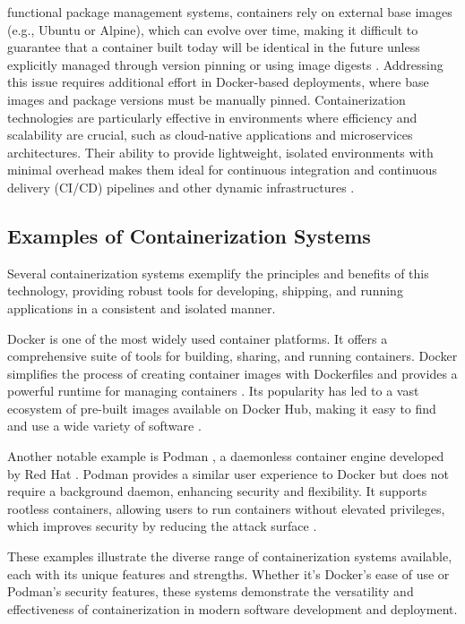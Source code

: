 functional package management systems, containers rely on external base images
(e.g., Ubuntu or Alpine), which can evolve over time, making it difficult to
guarantee that a container built today will be identical in the future unless
explicitly managed through version pinning or using image digests
\cite{InotifySharedDrives}. Addressing this issue requires additional
effort in Docker-based deployments, where base images and package versions
must be manually pinned.
Containerization technologies are particularly effective in environments
where efficiency and scalability are crucial, such as
cloud-native applications and microservices architectures. Their ability
to provide lightweight, isolated environments with minimal overhead makes
them ideal for continuous integration and continuous delivery (CI/CD)
pipelines and other dynamic infrastructures \cite{Cgroups2024}.

\subsection{Examples of Containerization Systems}

Several containerization systems exemplify the principles and benefits of this
technology, providing robust tools for developing, shipping, and running applications
in a consistent and isolated manner.

Docker \cite{DockerHomepage2022} is one of the most widely used container platforms.
It offers a comprehensive suite of tools for building, sharing, and running containers.
Docker simplifies the process of creating container images with Dockerfiles and
provides a powerful runtime for managing containers \cite{DockerfileReference0200}.
Its popularity has led to a vast ecosystem of pre-built images available on Docker
Hub, making it easy to find and use a wide variety of software \cite{DockerHubContainer}.

Another notable example is Podman \cite{Podman2024}, a daemonless container engine
developed by Red Hat \cite{RedHatWe}. Podman provides a similar user experience to
Docker but does not require a background daemon, enhancing security and flexibility.
It supports rootless containers, allowing users to run containers without elevated
privileges, which improves security by reducing the attack surface \cite[4.1]
{priedhorskyMinimizingPrivilegeBuilding2021}.

These examples illustrate the diverse range of containerization systems available,
each with its unique features and strengths. Whether it's Docker's ease of use or
Podman's security features, these systems demonstrate the versatility and effectiveness
of containerization in modern software development and deployment.


